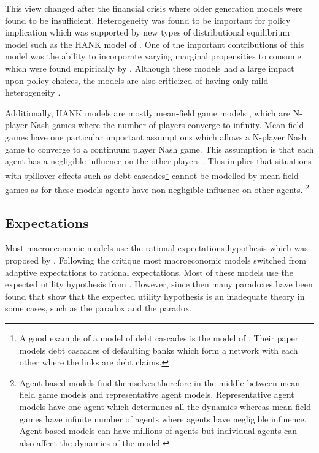 This view changed after the financial crisis where older generation models were found to be insufficient. Heterogeneity was found to be important for policy implication which was supported by new types of distributional equilibrium model such as the HANK model of \cite{kaplan_monetary_2018}. One of the important contributions of this model was the ability to incorporate varying marginal propensities to consume which were found empirically by \cite{fagereng_mpc_2021}. Although these models had a large impact upon policy choices, the models are also criticized of having only mild heterogeneity \citep{fagiolo_macroeconomic_2017}.

Additionally, HANK models are mostly mean-field game models \citep{achdou_income_2022}, which are N-player Nash games where the number of players converge to infinity. Mean field games have one particular important assumptions which allows a N-player Nash game to converge to a continuum player Nash game. This assumption is that each agent has a negligible influence on the other players \citep{cardaliaguet_master_2019}. This implies that situations with spillover effects such as debt cascades\footnote{A good example of a model of debt cascades is the model of \cite{eisenberg_systemic_2001}. Their paper models debt cascades of defaulting banks which form a network with each other where the links are debt claims.} cannot be modelled by mean field games as for these models agents have non-negligible influence on other agents. \footnote{Agent based models find themselves therefore in the middle between mean-field game models and representative agent models. Representative agent models have one agent which determines all the dynamics whereas mean-field games have infinite number of agents where agents have negligible influence. Agent based models can have millions of agents but individual agents can also affect the dynamics of the model.}
\subsection{Expectations}
Most macroeconomic models use the rational expectations hypothesis which was proposed by  \cite{muth_rational_1961}. Following the \cite{lucas_econometric_1976} critique most macroeconomic models switched from adaptive expectations to rational expectations. Most of these models use the expected utility hypothesis from \cite{von_neuman_theory_1953}. However, since then many paradoxes have been found that show that the expected utility hypothesis is an inadequate theory in some cases, such as the \cite{ellsberg_risk_1961} paradox and the \cite{Allais_1953} paradox.\\

